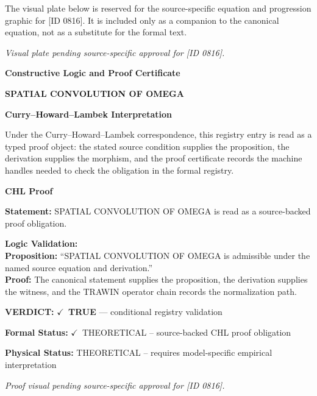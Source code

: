 \begingroup\footnotesize\sloppy
The visual plate below is reserved for the source-specific equation and progression graphic for [ID 0816]. It is included only as a companion to the canonical equation, not as a substitute for the formal text.
\par\endgroup
\begingroup\footnotesize\itshape
Visual plate pending source-specific approval for [ID 0816].
\par\endgroup

\clearpage
\begingroup\tzpsupportsetup
\noindent\textbf{\fontsize{10.8pt}{12.8pt}\selectfont [ID 0816] Constructive Logic and Proof Certificate}\par
\noindent\textbf{\fontsize{10pt}{12pt}\selectfont SPATIAL CONVOLUTION OF OMEGA}\par
\vspace{0.45em}
\begingroup
\footnotesize
\setlength{\parskip}{0.22em}
\setlength{\parindent}{0pt}
\noindent\textbf{Curry--Howard--Lambek Interpretation}\par
Under the Curry--Howard--Lambek correspondence, this registry entry is read as a typed proof
object: the stated source condition supplies the proposition, the derivation supplies the
morphism, and the proof certificate records the machine handles needed to check the obligation
in the formal registry.

\vspace{0.45em}
\noindent\textbf{CHL Proof}\par
\textbf{Statement:} SPATIAL CONVOLUTION OF OMEGA is read as a source-backed proof obligation.

\textbf{Logic Validation:}\\
\textbf{Proposition:} ``SPATIAL CONVOLUTION OF OMEGA is admissible under the named source equation and derivation.''\\
\textbf{Proof:} The canonical statement supplies the proposition, the derivation supplies the witness, and the TRAWIN operator chain records the normalization path.

\textbf{VERDICT:} \ensuremath{\checkmark}\ \textbf{TRUE} --- conditional registry validation

\textbf{Formal Status:} \ensuremath{\checkmark}\ THEORETICAL -- source-backed CHL proof obligation

\textbf{Physical Status:} THEORETICAL -- requires model-specific empirical interpretation
\par\vspace{0.45em}
\par
\vfill
\begingroup\footnotesize\itshape
Proof visual pending source-specific approval for [ID 0816].
\par\endgroup
\vfill
\endgroup
\endgroup
